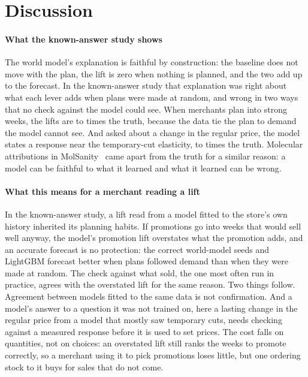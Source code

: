 \section{Discussion}
\label{sec:discussion}

\paragraph{What the known-answer study shows}
The world model's explanation is faithful by construction: the baseline does not
move with the plan, the lift is zero when nothing is planned, and the two add up
to the forecast. In the known-answer study that explanation was right about what
each lever adds when plans were made at random, and wrong in two ways that no
check against the model could see. When merchants plan into strong weeks, the
lifts are \kaCoWmBiasLo{} to \kaCoWmBiasHi{} times the truth, because the data
tie the plan to demand the model cannot see. And asked about a change in the
regular price, the model states a response near the temporary-cut elasticity,
\kaClWmTimesLo{} to \kaCoWmTimesHi{} times the truth. Molecular attributions in
MolSanity~\cite{molsanity} came apart from the truth for a similar reason: a
model can be faithful to what it learned and what it learned can be wrong.

\paragraph{What this means for a merchant reading a lift}
In the known-answer study, a lift read from a model fitted to the store's own
history inherited its planning habits. If promotions go into weeks that would
sell well anyway, the model's promotion lift overstates what the promotion adds,
and an accurate forecast is no protection: the correct world-model seeds and
LightGBM forecast better when plans followed demand than when they were made at
random. The check against what sold, the one most often run in practice, agrees
with the overstated lift for the same reason. Two things follow. Agreement
between models fitted to the same data is not confirmation. And a model's
answer to a question it was not trained on, here a lasting change in the
regular price from a model that mostly saw temporary cuts, needs checking
against a measured response before it is used to set prices. The cost falls on quantities, not on
choices: an overstated lift still ranks the weeks to promote correctly, so a merchant using it to pick
promotions loses little, but one ordering stock to it buys for sales that do not come.

